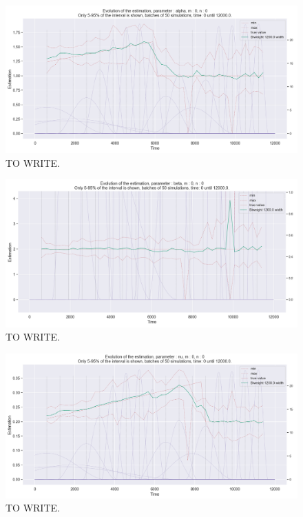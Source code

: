 \begin{figure}
\centering
\includegraphics[width = 0.90 \textwidth]{../imag/chap3/3/Figure_10.png}
\caption{TO WRITE.}
\label{fig:second_estimate_3_alpha}
\end{figure}

\begin{figure}
\centering
\includegraphics[width = 0.90 \textwidth]{../imag/chap3/3/Figure_11.png}
\caption{TO WRITE.}
\label{fig:second_estimate_3_beta}
\end{figure}

\begin{figure}
\centering
\includegraphics[width = 0.90 \textwidth]{../imag/chap3/3/Figure_12.png}
\caption{TO WRITE.}
\label{fig:second_estimate_3_nu}
\end{figure}












